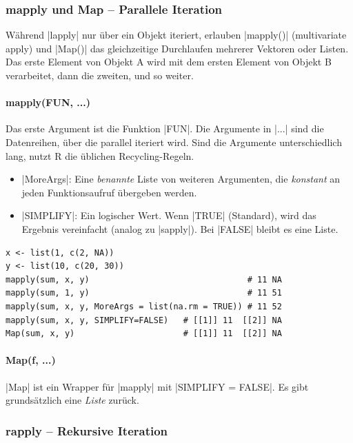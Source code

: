 \documentclass[10pt,twocolumn]{scrartcl}
\renewcommand{\lstinline}{\mycoloredinline}
\begin{document}
\subsubsection{mapply und Map -- Parallele Iteration}

Während \lstinline|lapply| nur über ein Objekt iteriert, erlauben \lstinline|mapply()| (multivariate apply) und \lstinline|Map()| das gleichzeitige Durchlaufen mehrerer Vektoren oder Listen. Das erste Element von Objekt A wird mit dem ersten Element von Objekt B verarbeitet, dann die zweiten, und so weiter.

\paragraph{mapply(FUN, ...)}

Das erste Argument ist die Funktion \lstinline|FUN|. Die Argumente in \lstinline|...| sind die Datenreihen, über die parallel iteriert wird. Sind die Argumente unterschiedlich lang, nutzt R die üblichen Recycling-Regeln.

\begin{itemize}
\item \lstinline|MoreArgs|: Eine \emph{benannte} Liste von weiteren Argumenten, die \emph{konstant} an jeden Funktionsaufruf übergeben werden.
\item \lstinline|SIMPLIFY|: Ein logischer Wert. Wenn \lstinline|TRUE| (Standard), wird das Ergebnis vereinfacht (analog zu \lstinline|sapply|). Bei \lstinline|FALSE| bleibt es eine Liste.
\end{itemize}

\begin{lstlisting}
x <- list(1, c(2, NA))
y <- list(10, c(20, 30))
mapply(sum, x, y)                                # 11 NA
mapply(sum, 1, y)                                # 11 51
mapply(sum, x, y, MoreArgs = list(na.rm = TRUE)) # 11 52
mapply(sum, x, y, SIMPLIFY=FALSE)   # [[1]] 11  [[2]] NA
Map(sum, x, y)                      # [[1]] 11  [[2]] NA
\end{lstlisting}


\paragraph{Map(f, ...)}

\lstinline|Map| ist ein Wrapper für \lstinline|mapply| mit \lstinline|SIMPLIFY = FALSE|. Es gibt grundsätzlich eine \emph{Liste} zurück.


\subsubsection{rapply -- Rekursive Iteration}
\end{document}
